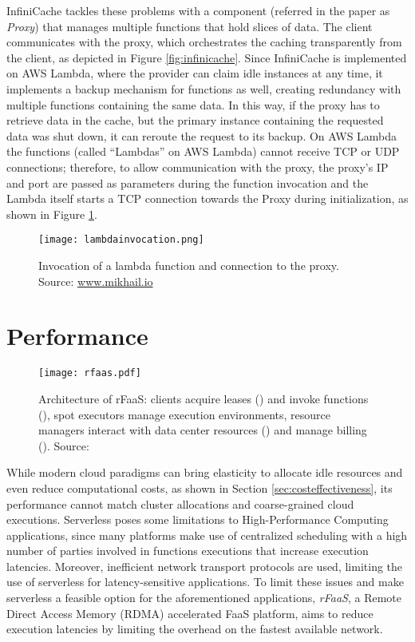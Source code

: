 \documentclass[
	a4paper, %
	12pt,
	twoside, %
]{LTJournalArticle}
\DeclareRobustCommand*\circledColorSmall[2]{\tikz[baseline=(char.base)]{
    \node[shape=circle,fill=#2,draw=#2,inner sep=0pt] (char) {\textcolor{white}{\footnotesize\textbf{#1}}};}}
\begin{document}
InfiniCache tackles these problems with a component (referred in the paper as \textit{Proxy}) that manages multiple functions that hold slices of data. The client communicates with the proxy, which orchestrates the caching transparently from the client, as depicted in Figure \ref{fig:infinicache}.
Since InfiniCache is implemented on AWS Lambda, where the provider can claim idle instances at any time, it implements a backup mechanism for functions as well, creating redundancy with multiple functions containing the same data. In this way, if the proxy has to retrieve data in the cache, but the primary instance containing the requested data was shut down, it can reroute the request to its backup.
On AWS Lambda the functions (called ``Lambdas'' on AWS Lambda) cannot receive TCP or UDP connections; therefore, to allow communication with the proxy, the proxy's IP and port are passed as parameters during the function invocation and the Lambda itself starts a TCP connection towards the Proxy during initialization, as shown in Figure \ref{fig:lambdainvocation}. 

\begin{figure}[!hbt]
	\texttt{[image: lambdainvocation.png]}
	\caption{Invocation of a lambda function and connection to the proxy. Source: \href{https://mikhail.io/2020/03/infinicache-distributed-cache-on-aws-lambda/}{www.mikhail.io}}
	\label{fig:lambdainvocation}
\end{figure}

\section{Performance}
\label{sec:performance}

\begin{figure}[!hbt]
	\texttt{[image: rfaas.pdf]}
	\caption{Architecture of rFaaS: clients acquire leases (\circledColorSmall{A}{brown}) and invoke functions (\circledColorSmall{D}{brown}), spot executors manage execution environments, resource managers interact with data center resources (\circledColorSmall{C}{brown}) and manage billing (\circledColorSmall{B}{brown}). Source: \cite{copik_rfaas_2023}}
	\label{fig:rfaas}
\end{figure}

While modern cloud paradigms can bring elasticity to allocate idle resources and even reduce computational costs, as shown in Section \ref{sec:costeffectiveness}, its performance cannot match cluster allocations and coarse-grained cloud executions. Serverless poses some limitations to High-Performance Computing applications, since many platforms make use of centralized scheduling with a high number of parties involved in functions executions that increase execution latencies. Moreover, inefficient network transport protocols are used, limiting the use of serverless for latency-sensitive applications. To limit these issues and make serverless a feasible option for the aforementioned applications, \textit{rFaaS}, a Remote Direct Access Memory (RDMA) accelerated FaaS platform, aims to reduce execution latencies by limiting the overhead on the fastest available network.
\end{document}
